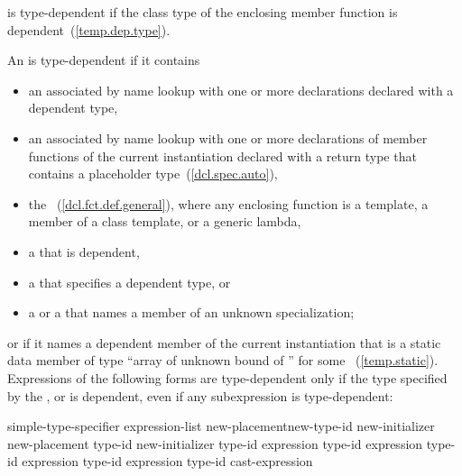 \pnum
{}
is type-dependent if the class type of the enclosing member function is
dependent~(\ref{temp.dep.type}).

\pnum
An
is type-dependent if it contains

\begin{itemize}
\item
an
associated by name lookup with one or more declarations
declared with a dependent type,

\item
an  associated by name lookup with one or more
declarations of member functions of the current instantiation declared
with a return type that contains a placeholder type~(\ref{dcl.spec.auto}),

\item
the
~(\ref{dcl.fct.def.general}), where any enclosing function is a
template, a member of a class template, or a generic lambda,

\item
a
that is dependent,

\item
a
that specifies a dependent type, or

\item
a
or a
that names a member of an unknown specialization;
\end{itemize}

or if it names a dependent member of the current instantiation that is a static
data member of type
``array of unknown bound of '' for some ~(\ref{temp.static}).
Expressions of the following forms are type-dependent only if the type
specified by the
,
or
is dependent, even if any subexpression is type-dependent:

\begin{ncbnftab}
simple-type-specifier \terminal{(} expression-list\opt \terminal{)}\br
{} new-placement\opt new-type-id new-initializer\opt\br
{} new-placement\opt \terminal{(} type-id \terminal{)} new-initializer\opt\br
{} type-id \terminal{> (} expression \terminal{)}\br
{} type-id \terminal{> (} expression \terminal{)}\br
{} type-id \terminal{> (} expression \terminal{)}\br
{} type-id \terminal{> (} expression \terminal{)}\br
\terminal{(} type-id \terminal{)} cast-expression
\end{ncbnftab}

